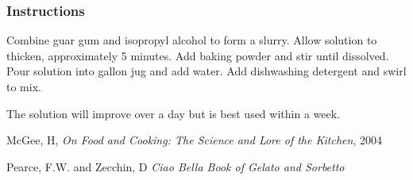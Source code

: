 \documentclass[12pt,landscape,twoside,twocolumn, openright, titlepage, draft]{book}
\begin{document}
\subsubsection{Instructions}
Combine guar gum and isopropyl alcohol to form a slurry. Allow solution to thicken, approximately 5 minutes. Add baking powder and stir until dissolved. Pour solution into gallon jug and add water. Add dishwashing detergent and swirl to mix.

The solution will improve over a day but is best used within a week.

\begin{thebibliography}{99}

 McGee, H, {\it On Food and Cooking: The Science and Lore of the Kitchen}, 2004

 Pearce, F.W. and Zecchin, D {\it Ciao Bella Book of Gelato and Sorbetto}
\end{thebibliography}
\end{document}
